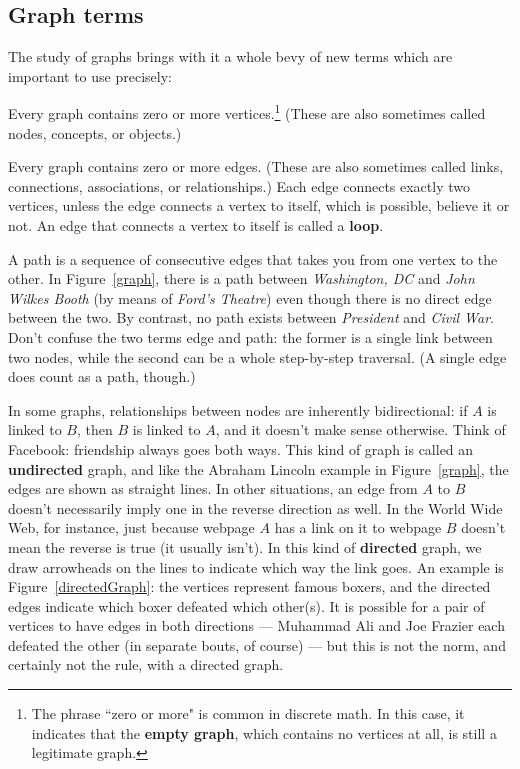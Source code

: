 \subsection{Graph terms}

The study of graphs brings with it a whole bevy of new terms which are
important to use precisely:

\begin{description}

\item[vertex.] Every graph contains zero or more vertices.\footnote{The
phrase ``zero or more" is common in discrete math. In this case, it
indicates that the \textbf{empty graph}, which contains no vertices at all,
is still a legitimate graph.} (These are also sometimes called nodes,
concepts, or objects.)

\item[edge.] Every graph contains zero or more edges. (These are also
sometimes called links, connections, associations, or relationships.) Each
edge connects exactly two vertices, unless the edge connects a vertex to
itself, which is possible, believe it or not. An edge that connects a
vertex to itself is called a \textbf{loop}.

\item[path.] A path is a sequence of consecutive edges that takes you from
one vertex to the other. In Figure~\ref{graph}, there is a path between
\textsl{Washington, DC} and \textsl{John Wilkes Booth} (by means of
\textsl{Ford's Theatre}) even though there is no direct edge between the
two. By contrast, no path exists between \textsl{President} and
\textsl{Civil War}. Don't confuse the two terms edge and path: the former
is a single link between two nodes, while the second can be a whole
step-by-step traversal. (A single edge does count as a path, though.)

\item[directed/undirected.] In some graphs, relationships between nodes are
inherently bidirectional: if $A$ is linked to $B$, then $B$ is linked
to $A$, and it doesn't make sense otherwise. Think of Facebook: friendship
always goes both ways. This kind of graph is called an \textbf{undirected}
graph, and like the Abraham Lincoln example in Figure~\ref{graph}, the
edges are shown as straight lines. In other situations, an edge from $A$ to
$B$ doesn't necessarily imply one in the reverse direction as well. In the
World Wide Web, for instance, just because webpage $A$ has a link on it to
webpage $B$ doesn't mean the reverse is true (it usually isn't). In this
kind of \textbf{directed} graph, we draw arrowheads on the lines to
indicate which way the link goes. An example is Figure~\ref{directedGraph}:
the vertices represent famous boxers, and the directed edges indicate which
boxer defeated which other(s). It is possible for a pair of vertices to
have edges in both directions --- Muhammad Ali and Joe Frazier each
defeated the other (in separate bouts, of course) --- but this is not the
norm, and certainly not the rule, with a directed graph.


\end{description}
